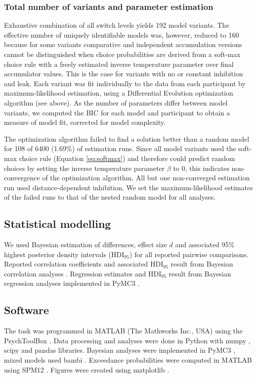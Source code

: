 \documentclass[11pt, a4paper]{article}
\begin{document}
\subsubsection*{Total number of variants and parameter estimation}
Exhaustive combination of all switch levels yields 192 model variants. The effective number of uniquely identifiable models was, however, reduced to 160 because for some variants comparative and independent accumulation versions cannot be distinguished when choice probabilities are derived from a soft-max choice rule with a freely estimated inverse temperature parameter over final accumulator values. This is the case for variants with no or constant inhibition and leak. Each variant was fit individually to the data from each participant by maximum-likelihood estimation, using a Differential Evolution optimization algorithm (see above). As the number of parameters differ between model variants, we computed the BIC for each model and participant to obtain a measure of model fit, corrected for model complexity.

The optimization algorithm failed to find a solution better than a random model for 108 of 6400 (1.69\%) of estimation runs. Since all model variants used the soft-max choice rule (Equation \ref{eq:softmax}) and therefore could predict random choices by setting the inverse temperature parameter $\beta$ to 0, this indicates non-convergence of the optimization algorithm. All but one non-converged estimation run used distance-dependent inhibition. We set the maximum-likelihood estimates of the failed runs to that of the nested random model for all analyses.

\subsection*{Statistical modelling}
We used Bayesian estimation \parencite[BEST;][]{kruschke2013BayesianEstimationSupersedes,kruschke2014DoingBayesianData} of differences, effect size $d$ and associated 95\% highest posterior density intervals (HDI$_{95}$) for all reported pairwise comparisons. Reported correlation coefficients and associated HDI$_{95}$ result from Bayesian correlation analyses \parencite{lee2013BayesianCognitiveModeling}. Regression estimates and HDI$_{95}$ result from Bayesian regression analyses implemented in PyMC3 \parencite{salvatier2016ProbabilisticProgrammingPython}.

\subsection*{Software}
The task was programmed in MATLAB (The Mathworks Inc., USA) using the PsychToolBox \parencite{brainard1997psychophysics}. Data processing and analyses were done in Python with numpy \parencite{harris2020array}, scipy \parencite{jones2001SciPyOpenSource} and pandas \parencite{mckinney2012PythonDataAnalysis} libraries. Bayesian analyses were implemented in PyMC3 \parencite{salvatier2016ProbabilisticProgrammingPython}, mixed models used bambi \parencite{yarkoni2016BambiSimpleInterface}. Exceedance probabilities were computed in MATLAB using SPM12 \parencite{penny2011statistical}. Figures were created using matplotlib \parencite{hunter2007Matplotlib2DGraphics}.
\end{document}
